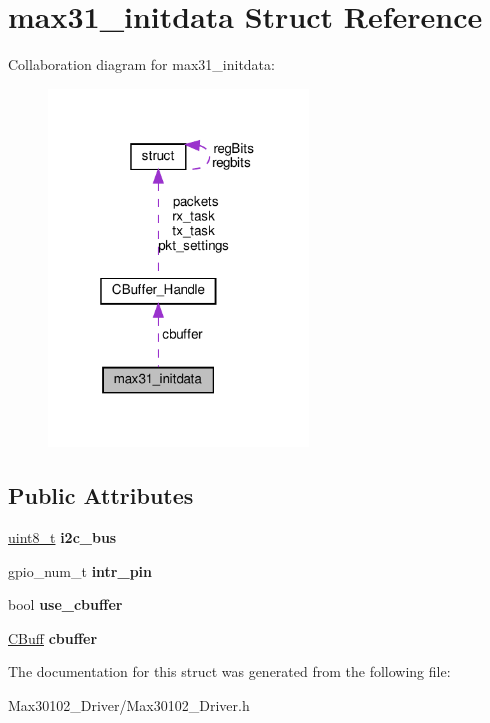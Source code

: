 \hypertarget{structmax31__initdata}{}\section{max31\+\_\+initdata Struct Reference}
\label{structmax31__initdata}


Collaboration diagram for max31\+\_\+initdata\+:\nopagebreak
\begin{figure}[H]
\begin{center}
\leavevmode
\includegraphics[width=196pt]{structmax31__initdata__coll__graph}
\end{center}
\end{figure}
\subsection*{Public Attributes}
\begin{DoxyCompactItemize}
\item 
\mbox{\label{structmax31__initdata_ab5db3540298afbf9a8c8daf16d8c8ae9}} 
\hyperlink{vl53l0x__types_8h_aba7bc1797add20fe3efdf37ced1182c5}{uint8\+\_\+t} {\bfseries i2c\+\_\+bus}
\item 
\mbox{\label{structmax31__initdata_a860bfc03e8c60fb5874cbbb7738e4e06}} 
gpio\+\_\+num\+\_\+t {\bfseries intr\+\_\+pin}
\item 
\mbox{\label{structmax31__initdata_a76583a0592895644e43f89a93e47cde1}} 
bool {\bfseries use\+\_\+cbuffer}
\item 
\mbox{\label{structmax31__initdata_a4ddb43c043327642a95058ce4d6eb235}} 
\hyperlink{structCBuffer__Handle}{C\+Buff} {\bfseries cbuffer}
\end{DoxyCompactItemize}


The documentation for this struct was generated from the following file\+:\begin{DoxyCompactItemize}
\item 
Max30102\+\_\+\+Driver/Max30102\+\_\+\+Driver.\+h\end{DoxyCompactItemize}
